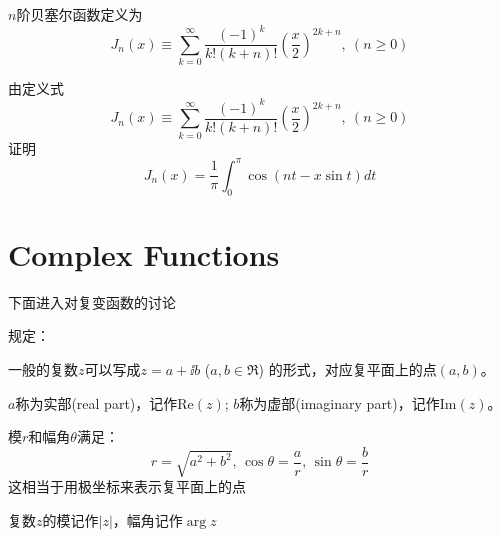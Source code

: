 \documentclass[CJK]{beamer}
\begin{document}
\begin{frame}
\bch
$n$阶贝塞尔函数定义为
\tbox
{$$J_n(x) \equiv \sum_{k=0}^\infty \frac{(-1)^k}{k!(k+n)!} \left(\frac{x}{2}\right)^{2k+n},\ (n\ge 0)$$ }
\ech
\end{frame}


\begin{frame}
\bch
由定义式
\tbox
{$$J_n(x) \equiv \sum_{k=0}^\infty \frac{(-1)^k}{k!(k+n)!} \left(\frac{x}{2}\right)^{2k+n},\ (n\ge 0)$$ }
证明
\tbox
{$$J_n(x) = \frac{1}{\pi} \int_0^\pi\cos\left(nt - x \sin t\right)dt$$}
\ech
\end{frame}



\begin{frame}
\bch
{}
\ech
\end{frame}



\section{Complex Functions}


\begin{frame}
  \bch
  {\Large 下面进入对复变函数的讨论}
\ech
\end{frame}

\begin{frame}
\bch
规定：

一般的复数$z$可以写成$z=a +  \ii b $ ($a, b\in \Re$) 的形式，对应复平面上的点$(a, b)$。

$a$称为实部(real part)，记作$\mathrm{Re}(z)$; $b$称为虚部(imaginary part)，记作$\mathrm{Im}(z)$。

\emini
{}
\emini
\ech
\end{frame}



\begin{frame}
\bch
{}

模$r$和幅角$\theta$满足：
$$ r = \sqrt{a^2+b^2},\, \cos\theta = \frac{a}{r},\, \sin\theta = \frac{b}{r}$$
这相当于用极坐标来表示复平面上的点

\skipline

复数$z$的模记作$|z|$，幅角记作$\arg z$
\emini
{}
\emini

\ech
\end{frame}
\end{document}
